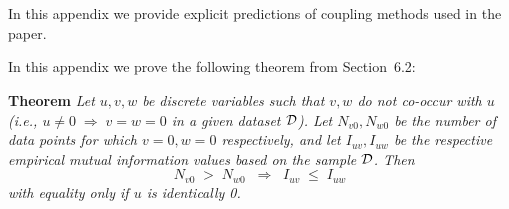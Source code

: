 \documentclass[twoside,11pt]{article}
\newcommand{\dataset}{{\cal D}}
\begin{document}

%





\newpage

\appendix
\section{}
\label{app:explicit}



In this appendix we provide explicit predictions of coupling methods used in the paper.



In this appendix we prove the following theorem from
Section~6.2:

\noindent
{\bf Theorem} {\it Let $u,v,w$ be discrete variables such that $v, w$ do
not co-occur with $u$ (i.e., $u\neq0\;\Rightarrow \;v=w=0$ in a given
dataset $\dataset$). Let $N_{v0},N_{w0}$ be the number of data points for
which $v=0, w=0$ respectively, and let $I_{uv},I_{uw}$ be the
respective empirical mutual information values based on the sample
$\dataset$. Then
\[
	N_{v0} \;>\; N_{w0}\;\;\Rightarrow\;\;I_{uv} \;\leq\;I_{uw}
\]
with equality only if $u$ is identically 0.} \hfill\BlackBox
\end{document}
